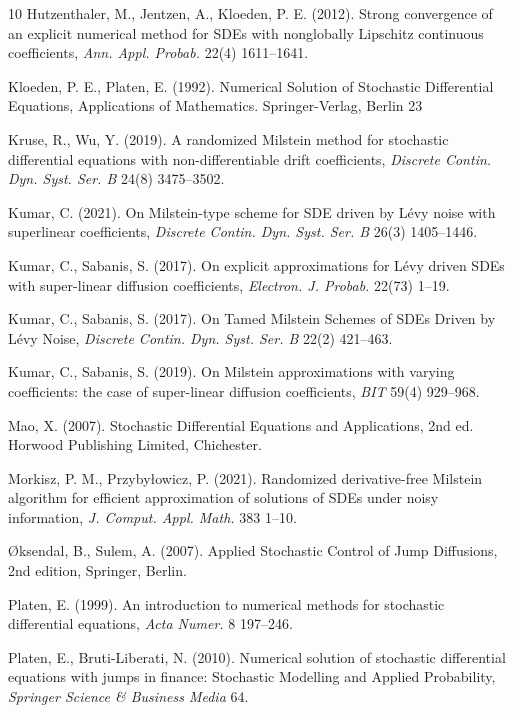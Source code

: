 \documentclass[reqno,  oneside, 12pt]{amsart}
\begin{document}
\begin{thebibliography}{10}
		Hutzenthaler, M., Jentzen, A., Kloeden, P. E. (2012). Strong convergence of an explicit numerical method for SDEs with nonglobally Lipschitz continuous coefficients, \emph{Ann. Appl. Probab.} 22(4) 1611--1641.
		
	
		
		Kloeden, P. E., Platen, E. (1992). Numerical Solution of Stochastic Differential Equations, Applications of Mathematics. Springer-Verlag, Berlin 23
		
		Kruse, R., Wu, Y. (2019). A randomized Milstein method for stochastic differential equations with non-differentiable drift coefficients, \emph{Discrete Contin. Dyn. Syst. Ser. B} 24(8) 3475--3502.
		
		Kumar, C. (2021). On Milstein-type scheme for SDE driven by L\'evy noise with superlinear coefficients, \emph{Discrete Contin. Dyn. Syst. Ser. B} 26(3) 1405--1446.
		
		Kumar, C., Sabanis, S. (2017). On explicit approximations for L\'evy driven SDEs with super-linear diffusion coefficients, \emph{Electron. J. Probab.} 22(73) 1--19.
		
		Kumar, C., Sabanis, S. (2017). On Tamed Milstein Schemes of SDEs Driven by L\'evy Noise, \emph{Discrete Contin. Dyn. Syst. Ser. B} 22(2) 421--463.
		
		Kumar, C., Sabanis, S. (2019). On Milstein approximations with varying coefficients: the case of super-linear diffusion coefficients, \emph{BIT} 59(4) 929--968.
		
	
		
		Mao, X. (2007). Stochastic Differential Equations and Applications, 2nd ed. Horwood Publishing Limited, Chichester.
		
		Morkisz, P. M., Przyby{\l}owicz, P. (2021). Randomized derivative-free Milstein algorithm for efficient approximation of solutions of SDEs under noisy information, \emph{J. Comput. Appl. Math.} 383 1--10.
		
		\O ksendal, B., Sulem, A. (2007). Applied Stochastic Control of Jump Diffusions, 2nd edition, Springer, Berlin.
		
		Platen, E. (1999). An introduction to numerical methods for stochastic differential equations, \emph{Acta Numer.} 8 197--246.
		
		Platen, E., Bruti-Liberati, N. (2010). Numerical solution of stochastic differential equations with jumps in finance: Stochastic Modelling and Applied Probability, \emph{Springer Science \& Business Media} 64.
		

\end{thebibliography}
\end{document}
